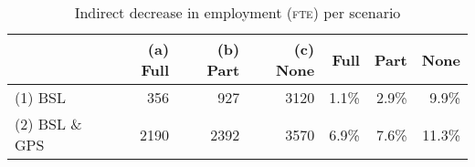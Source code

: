 \begin{table}[H]
\centering
\caption{\label{comjlinex} Indirect decrease in employment (\textsc{fte})  per scenario} 
\begin{tabular}{lrrr|rrr}
  \hline
 &  (a) Full & (b) Part & (c) None & Full & Part & None \\ 
  \hline
(1) BSL & 356 & 927 & 3120 & 1.1\% & 2.9\% & 9.9\% \\ 
  (2) BSL \& GPS & 2190 & 2392 & 3570 & 6.9\% & 7.6\% & 11.3\% \\ 
   \hline
\end{tabular}
\end{table}
